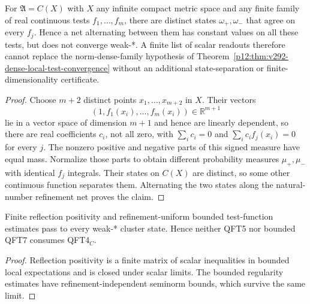\documentclass[12pt,a4paper]{article}
\begin{document}
\begin{proposition}
\label{p12:prop:v292-finite-tests-phase-countermodel}
For $\mathfrak A=C(X)$ with $X$ any infinite compact metric space and
any finite family of real continuous tests $f_1,\ldots,f_m$, there are
distinct states $\omega_+,\omega_-$ that agree on every $f_j$.  Hence a
net alternating between them has constant values on all these tests,
but does not converge weak-*.  A finite list of scalar readouts therefore
cannot replace the norm-dense-family hypothesis of
Theorem~\ref{p12:thm:v292-dense-local-test-convergence} without an
additional state-separation or finite-dimensionality certificate.
\end{proposition}
\begin{proof}
Choose $m+2$ distinct points $x_1,\ldots,x_{m+2}$ in $X$.
Their vectors
\[
(1,f_1(x_i),\ldots,f_m(x_i))\in\mathbb R^{m+1}
\]
lie in a vector space of dimension $m+1$ and hence are linearly
dependent, so there are real coefficients
$c_i$, not all zero, with $\sum_i c_i=0$ and
$\sum_i c_if_j(x_i)=0$ for every $j$.  The nonzero positive and negative
parts of this signed measure have equal mass.  Normalize those parts
to obtain different probability measures $\mu_+,\mu_-$ with identical
$f_j$ integrals.  Their states on $C(X)$ are distinct, so some other
continuous function separates them.  Alternating the two states along
the natural-number refinement net proves the claim.
\end{proof}

\begin{corollary}
\label{p12:cor:v283-cluster-rp-regularity}
Finite reflection positivity and refinement-uniform bounded test-function estimates pass to every weak-* cluster state.  Hence neither QFT5 nor bounded QFT7 consumes QFT4$_C$.
\end{corollary}
\begin{proof}
Reflection positivity is a finite matrix of scalar inequalities in bounded local expectations and is closed under scalar limits.  The bounded regularity estimates have refinement-independent seminorm bounds, which survive the same limit.
\end{proof}
\end{document}
